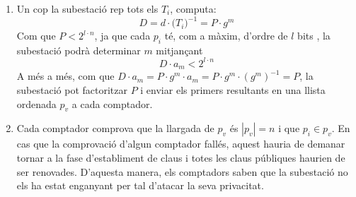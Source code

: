 \begin{enumerate}
\begin{enumerate}
		\item Un cop la subestació rep tots els $T_i$, computa:
		\[D = d \cdot \Big( T_i \Big)^{-1} = P \cdot g^m\]
		Com que $P < 2^{l \cdot n}$, ja que cada $p_i$ té, com a màxim, d'ordre de $l$ bits , la subestació podrà determinar $m$ mitjançant
		\[D \cdot a_m  < 2^{l \cdot n}\]
		A més a més, com que $D \cdot a_m = P \cdot g^m \cdot a_m = P \cdot g^m \cdot (g^m)^{-1} = P$, la subestació pot factoritzar $P$ i enviar els primers resultants en una llista ordenada $p_v$ a cada comptador.
		\item Cada comptador comprova que la llargada de $p_v$ és $|p_v| = n$ i que $p_i \in p_v$. En cas que la comprovació d'algun comptador fallés, aquest hauria de demanar tornar a la fase d'establiment de claus i totes les claus públiques haurien de ser renovades. D'aquesta manera, els comptadors saben que la subestació no els ha estat enganyant per tal d'atacar la seva privacitat.
		
	\end{enumerate}
\end{enumerate}


